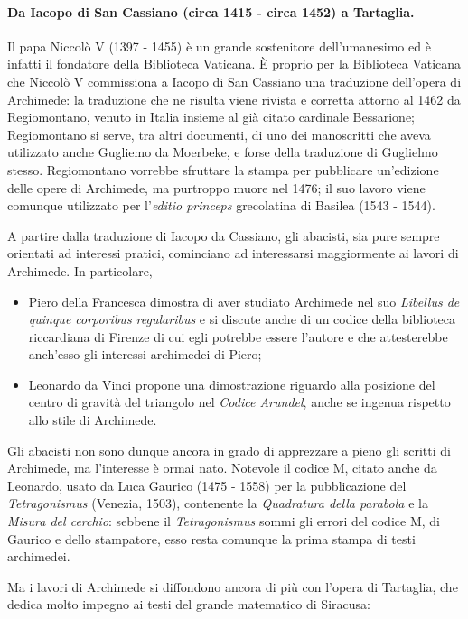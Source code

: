 \paragraph{Da Iacopo di San Cassiano (circa 1415 - circa 1452) a Tartaglia.} Il papa Niccol\`o V (1397 - 1455) \`e un grande sostenitore dell'umanesimo ed \`e infatti il fondatore della Biblioteca Vaticana. \`E proprio per la Biblioteca Vaticana che Niccol\`o V commissiona a Iacopo di San Cassiano una traduzione dell'opera di Archimede: la traduzione che ne risulta viene rivista e corretta attorno al 1462 da Regiomontano, venuto in Italia insieme al gi\`a citato cardinale Bessarione; Regiomontano si serve, tra altri documenti, di uno dei manoscritti che aveva utilizzato anche Gugliemo da Moerbeke, e forse della traduzione di Guglielmo stesso. Regiomontano vorrebbe sfruttare la stampa per pubblicare un'edizione delle opere di Archimede, ma purtroppo muore nel 1476; il suo lavoro viene comunque utilizzato per l'\textit{editio princeps} grecolatina di Basilea (1543 - 1544).
\par A partire dalla traduzione di Iacopo da Cassiano, gli abacisti, sia pure sempre orientati ad interessi pratici, cominciano ad interessarsi maggiormente ai lavori di Archimede. In particolare,
\begin{itemize}
	\item Piero della Francesca dimostra di aver studiato Archimede nel suo \textit{Libellus de quinque corporibus regularibus} e si discute anche di un codice della biblioteca riccardiana di Firenze di cui egli potrebbe essere l'autore e che attesterebbe anch'esso gli interessi archimedei di Piero;
	\item Leonardo da Vinci propone una dimostrazione riguardo alla posizione del centro di gravit\`a del triangolo nel \textit{Codice Arundel}, anche se ingenua rispetto allo stile di Archimede.
\end{itemize}
\par Gli abacisti non sono dunque ancora in grado di apprezzare a pieno gli scritti di Archimede, ma l'interesse \`e ormai nato. Notevole il codice M, citato anche da Leonardo, usato da Luca Gaurico (1475 - 1558) per la pubblicazione del \textit{Tetragonismus} (Venezia, 1503), contenente la \textit{Quadratura della parabola} e la \textit{Misura del cerchio}: sebbene il \textit{Tetragonismus} sommi gli errori del codice M, di Gaurico e dello stampatore, esso resta comunque la prima stampa di testi archimedei.
\par Ma i lavori di Archimede si diffondono ancora di pi\`u con l'opera di Tartaglia, che dedica molto impegno ai testi del grande matematico di Siracusa:
